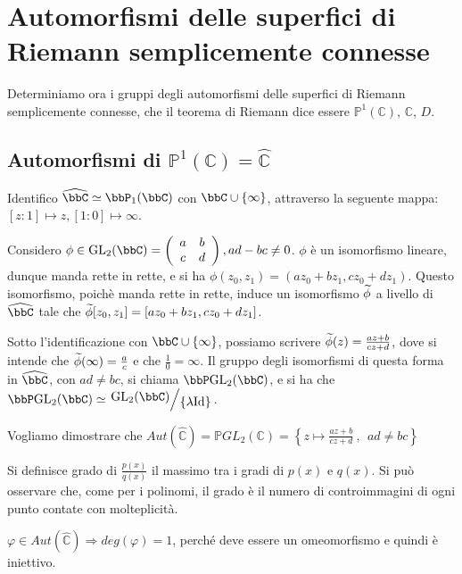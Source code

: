 \chapter{Automorfismi delle superfici di Riemann semplicemente connesse}

Determiniamo ora i gruppi degli automorfismi delle superfici di Riemann semplicemente
connesse, che il teorema di Riemann dice essere $\mathbb{P}^1(\mathbb{C})$, $\mathbb{C}$, $D$.


\section{Automorfismi di $\mathbb{P}^1(\mathbb{C})=\hat{\mathbb{C}}$}

Identifico $\oc\bbC\isom\bbP_1(\bbC)$ con $\bbC\cup\{\infty\}$, attraverso la seguente mappa: $[z:1]\mapsto z, [1:0]\mapsto\infty$.

Considero $\phi\in\GL_2(\bbC)=\matrice abcd, ad-bc \neq 0$. $\phi$ è un isomorfismo lineare, dunque manda rette in rette, e si ha $\phi(z_0,z_1)=(az_0+bz_1,cz_0+dz_1)$. Questo isomorfismo, poichè manda rette in rette, induce un isomorfismo $\widetilde{\phi}$ a livello di $\oc\bbC$ tale che $\widetilde{\phi}[z_0,z_1]=[az_0+bz_1,cz_0+dz_1]$.

Sotto l'identificazione con $\bbC\cup\{\infty\}$, possiamo scrivere $\widetilde{\phi}(z)=\frac{az+b}{cz+d}$, dove si intende che $\widetilde{\phi}(\infty)=\frac{a}{c}$ e che $\frac{1}{0}=\infty$. Il gruppo degli isomorfismi di questa forma in $\oc \bbC$, con $ad\neq bc$, si chiama $\bbP\GL_2(\bbC)$, e si ha che $\bbP\GL_2(\bbC)\isom\quotient{\GL_2(\bbC)}{\{\lambda\Id\}}$.

Vogliamo dimostrare che $Aut( \hat{\mathbb{C}} )= \mathbb{P}GL_2 (\mathbb{C} )=\left\{z\mapsto \displaystyle{\frac{az+b}{cz+d}} \ ,\ \  ad\neq bc\right\}$

\begin{definizione}
Si definisce grado di $\frac{p(x)}{q(x)}$ il massimo tra i gradi di $p(x)$ e $q(x)$.
Si può osservare che, come per i polinomi, il grado è il numero di controimmagini di ogni punto contate con molteplicità.
\end{definizione}

\begin{osservazione}
$\varphi \in Aut( \hat{\mathbb{C}} ) \Longrightarrow deg(\varphi )=1$, perché deve essere un omeomorfismo e quindi è iniettivo.
\end{osservazione}


